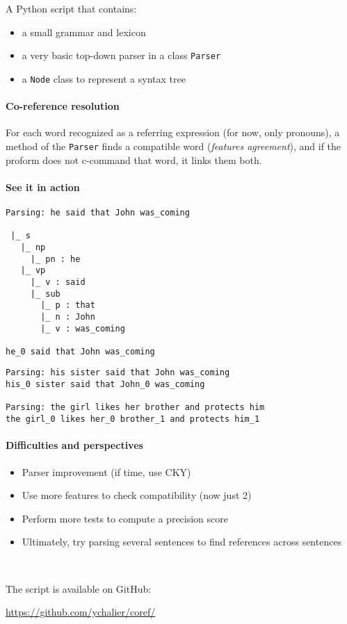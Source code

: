 \documentclass[a4paper]{article}
\begin{document}
A Python script that contains:

\begin{itemize}
\item a small grammar and lexicon
\item a very basic top-down parser in a class \texttt{Parser}
\item a \texttt{Node} class to represent a syntax tree
\end{itemize}

\paragraph{Co-reference resolution}
For each word recognized as a referring expression (for now, only pronouns), a method of the \texttt{Parser} finds a compatible word (\emph{features agreement}), and if the proform does not c-command that word, it links them both.

\paragraph{See it in action}

\begin{verbatim}
Parsing: he said that John was_coming

 |_ s
   |_ np
     |_ pn : he
   |_ vp
     |_ v : said
     |_ sub
       |_ p : that
       |_ n : John
       |_ v : was_coming

he_0 said that John was_coming
\end{verbatim}

\begin{verbatim}
Parsing: his sister said that John was_coming
his_0 sister said that John_0 was_coming

Parsing: the girl likes her brother and protects him
the girl_0 likes her_0 brother_1 and protects him_1
\end{verbatim}

\paragraph{Difficulties and perspectives}

\begin{itemize}
\item Parser improvement (if time, use CKY)
\item Use more features to check compatibility (now just 2)
\item Perform more tests to compute a precision score
\item Ultimately, try parsing several sentences to find references across sentences
\end{itemize}

~\par

The script is available on GitHub:

\url{https://github.com/ychalier/coref/}


\begin{thebibliography}{9}

\end{thebibliography}

\listoffigures

\listoftables
\end{document}
